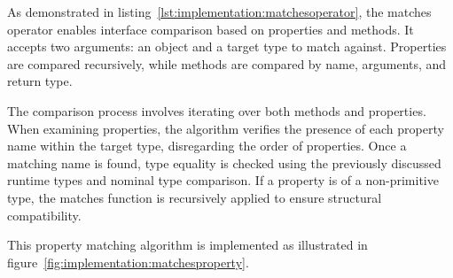 As demonstrated in listing~\ref{lst:implementation:matchesoperator}, the matches operator enables interface comparison based on properties and methods. It accepts two arguments: an object and a target type to match against. Properties are compared recursively, while methods are compared by name, arguments, and return type.

The comparison process involves iterating over both methods and properties. When examining properties, the algorithm verifies the presence of each property name within the target type, disregarding the order of properties. Once a matching name is found, type equality is checked using the previously discussed runtime types and nominal type comparison. If a property is of a non-primitive type, the matches function is recursively applied to ensure structural compatibility.

This property matching algorithm is implemented as illustrated in figure~\ref{fig:implementation:matchesproperty}.

